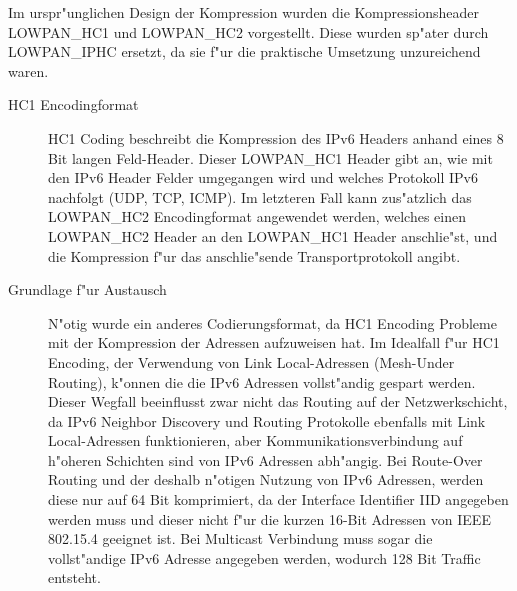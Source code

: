 \documentclass[final]{lktseminar}
\begin{document}
Im urspr"unglichen Design der Kompression \cite{rfc4944} wurden die Kompressionsheader LOWPAN\_HC1 und LOWPAN\_HC2 vorgestellt.
Diese wurden sp"ater durch LOWPAN\_IPHC \cite{rfc6282} ersetzt, da sie f"ur  die praktische Umsetzung unzureichend waren.
\begin{description}
    \item[HC1 Encodingformat] HC1 Coding beschreibt die Kompression des IPv6 Headers anhand eines 8 Bit langen
    Feld-Header. Dieser LOWPAN\_HC1 Header gibt an, wie mit den IPv6 Header Felder umgegangen wird und
    welches Protokoll IPv6 nachfolgt (UDP, TCP, ICMP). Im letzteren Fall kann zus"atzlich das LOWPAN\_HC2 Encodingformat
    angewendet werden, welches einen LOWPAN\_HC2 Header an den LOWPAN\_HC1 Header anschlie"st, und die Kompression
    f"ur das anschlie"sende Transportprotokoll angibt.

    \item[Grundlage f"ur Austausch] N"otig wurde ein anderes Codierungsformat, da HC1 Encoding Probleme mit der Kompression
    der Adressen aufzuweisen hat. Im Idealfall f"ur HC1 Encoding, der Verwendung von Link Local-Adressen (Mesh-Under Routing),
    k"onnen die die IPv6 Adressen vollst"andig gespart werden. Dieser Wegfall beeinflusst zwar nicht das Routing auf der
    Netzwerkschicht, da IPv6 Neighbor Discovery und Routing Protokolle ebenfalls mit Link Local-Adressen funktionieren, aber
    Kommunikationsverbindung auf h"oheren Schichten sind von IPv6 Adressen abh"angig. Bei Route-Over Routing und der deshalb
    n"otigen Nutzung von IPv6 Adressen, werden diese nur auf 64 Bit komprimiert, da der Interface Identifier IID angegeben werden
    muss und dieser nicht f"ur die kurzen 16-Bit Adressen von IEEE 802.15.4 geeignet ist. Bei Multicast Verbindung muss sogar
    die vollst"andige IPv6 Adresse angegeben werden, wodurch 128 Bit Traffic entsteht.
\end{description}




\end{document}
